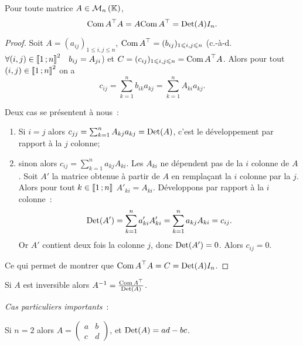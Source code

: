 \begin{prop}
  Pour toute matrice \(A \in \mathcal{M}_{n}\left(\mathbb{K}\right)\),
  \begin{equation}
    {\operatorname{Com}A}^{\top} A = A {\operatorname{Com} A}^{\top} = \operatorname{Det}(A) I_n.
  \end{equation}
\end{prop}
\begin{proof}
  Soit \(A=(a_{ij})_{1 \leqslant i,j \leqslant n}\), \({\operatorname{Com} A}^{\top} =
  (b_{ij})_{1 \leqslant i,j \leqslant n}\) (c.-à-d. \(\forall (i,j) \in
  \mathopen{\llbracket}1\mathclose{}\mathpunct{};n\mathclose{\rrbracket}^2 \quad b_{ij}=A_{ji}\)) et \(C=(c_{ij})_{1
  \leqslant i,j \leqslant n}={\operatorname{Com} A}^{\top} A\). Alors pour tout \((i,j)
  \in \mathopen{\llbracket}1\mathclose{}\mathpunct{};n\mathclose{\rrbracket}^2\) on a
  \begin{equation}
    c_{ij} = \sum_{k=1}^n b_{ik}a_{kj} = \sum_{k=1}^n A_{ki} a_{kj}.
  \end{equation}

  Deux cas se présentent à nous~:
  \begin{enumerate}
    \item Si \(i=j\) alors \(c_{jj} = \sum_{k=1}^n A_{kj} a_{kj} =
      \operatorname{Det}(A)\), c'est le développement par rapport à la \(j\)\ieme{}
      colonne;
    \item sinon alors \(c_{ij} = \sum_{k=1}^n a_{kj} A_{ki}\). Les
      \(A_{ki}\) ne dépendent pas de la \(i\)\ieme{} colonne de \(A\).
      Soit \(A'\) la matrice obtenue à partir de \(A\) en remplaçant la
      \(i\)\ieme{} colonne par la \(j\)\ieme{}. Alors pour tout \(k \in
      \mathopen{\llbracket}1\mathclose{}\mathpunct{};n\mathclose{\rrbracket}\) \(A'_{ki}=A_{ki}\). Développons par
      rapport à la \(i\)\ieme{} colonne~:
      \begin{equation}
        \operatorname{Det}(A') = \sum_{k=1}^n a'_{ki} A'_{ki} = \sum_{k=1}^n a_{kj}
        A_{ki} =c_{ij}.
      \end{equation}
      Or \(A'\) contient deux fois la colonne \(j\), donc \(\operatorname{Det}(A')=0\).
      Alors \(c_{ij}=0\).
  \end{enumerate}

  Ce qui permet de montrer que \({\operatorname{Com} A}^{\top} A = C = \operatorname{Det}(A) I_n\).
\end{proof}
\begin{corth}
  Si \(A\) est inversible alors \(A^{-1} = \frac{{\operatorname{Com}
  A}^{\top}}{\operatorname{Det}(A)}\).
\end{corth}

\emph{Cas particuliers importants}~:

Si \(n=2\) alors
\(A = \begin{pmatrix}
  a & b \\
  c & d
\end{pmatrix}
\),
et \(\operatorname{Det}(A) = ad-bc\).

